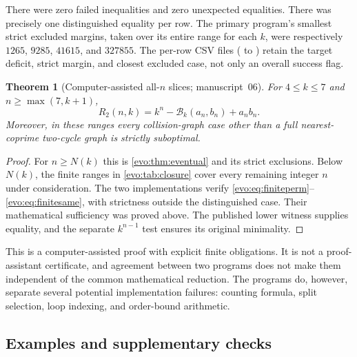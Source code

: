\documentclass[11pt,a4paper]{article}
\numberwithin{equation}{section}
\newtheorem{theorem}{Theorem}[section]
\theoremstyle{definition}
\theoremstyle{remark}
\newcommand{\Bip}{\mathcal B}
\begin{document}
There were zero failed inequalities and zero unexpected equalities. There was
precisely one distinguished equality per row. The primary program's smallest
strict excluded margins, taken over its entire range for each $k$, were
respectively $1265$, $9285$, $41615$, and $327855$. The per-row CSV files
( to ) retain
the target deficit, strict margin, and closest excluded case, not only an
overall success flag.

\begin{theorem}[Computer-assisted all-$n$ slices; manuscript~06]\label{evo:thm:smallk}
For $4\le k\le7$ and $n\ge\max(7,k+1)$,
\[
 R_2(n,k)=k^n-\Bip_k(a_n,b_n)+a_nb_n.
\]
Moreover, in these ranges every collision-graph case other than a full
nearest-coprime two-cycle graph is strictly suboptimal.
\end{theorem}
\begin{proof}
For $n\ge N(k)$ this is \cref{evo:thm:eventual} and its strict exclusions.
Below $N(k)$, the finite ranges in \cref{evo:tab:closure} cover every
remaining integer $n$ under consideration. The two implementations verify
\eqref{evo:eq:finiteperm}--\eqref{evo:eq:finitesame}, with strictness outside
the distinguished case. Their mathematical sufficiency was proved above. The
published lower witness supplies equality, and the separate $k^{n-1}$ test
ensures its original minimality.
\end{proof}

This is a computer-assisted proof with explicit finite obligations. It is not
a proof-assistant certificate, and agreement between two programs does not
make them independent of the common mathematical reduction. The programs do,
however, separate several potential implementation failures: counting
formula, split selection, loop indexing, and order-bound arithmetic.

\subsection{Examples and supplementary checks}
\end{document}
